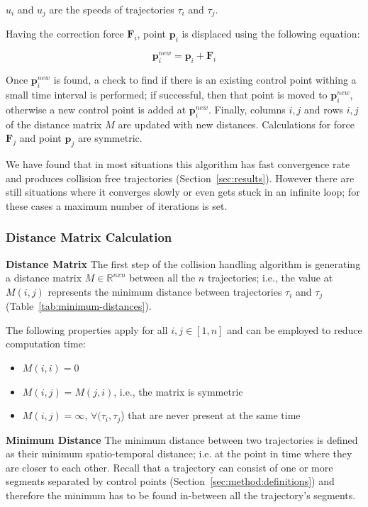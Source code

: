 $u_i$ and $u_j$ are the speeds of trajectories $\tau_i$ and $\tau_j$.

Having the correction force $\mathbf{F}_i$, point $\mathbf{p}_i$ is displaced using the following equation:

\begin{equation}
	\mathbf{p}_i^{new} = \mathbf{p}_i + \mathbf{F}_i
\end{equation}


Once $\mathbf{p}_i^{new}$ is found, a check to find if there is an existing control point withing a small time interval is performed; if successful, then that point is moved to $\mathbf{p}_i^{new}$, otherwise a new control point is added at $\mathbf{p}_i^{new}$.
Finally, columns $i, j$ and rows $i, j$ of the distance matrix $M$ are updated with new distances.
Calculations for force $\mathbf{F}_j$ and point $\mathbf{p}_j$ are symmetric.

We have found that in most situations this algorithm has fast convergence rate and produces collision free trajectories (Section~\ref{sec:results}).
However there are still situations where it converges slowly or even gets stuck in an infinite loop; for these cases a maximum number of iterations is set.


\subsubsection{Distance Matrix Calculation}
\label{sec:method:remove-collisions:distance-matrix}
\textbf{Distance Matrix} The first step of the collision handling algorithm is generating a distance matrix $M \in \mathbb{R}^{nxn}$ between all the $n$ trajectories; i.e., the value at $M(i, j)$ represents the minimum distance between trajectories $\tau_i$ and $\tau_j$ (Table~{\ref{tab:minimum-distances}}).

The following properties apply for all $i, j \in [1, n]$ and can be employed to reduce computation time:
\begin{itemize}
  \item $M(i, i) = 0$
  \item $M(i, j) = M(j, i)$, i.e., the matrix is symmetric
  \item $M(i, j) = \infty$, \hspace{0.1cm}$\forall (\tau_i, \tau_j$) that are never present at the same time
\end{itemize}

\textbf{Minimum Distance} The minimum distance between two trajectories is defined as their minimum spatio-temporal distance; i.e. at 	the point in time where they are closer to each other.
Recall that a trajectory can consist of one or more segments separated by control points (Section~\ref{sec:method:definitions}) and therefore the minimum has to be found in-between all the trajectory's segments.


